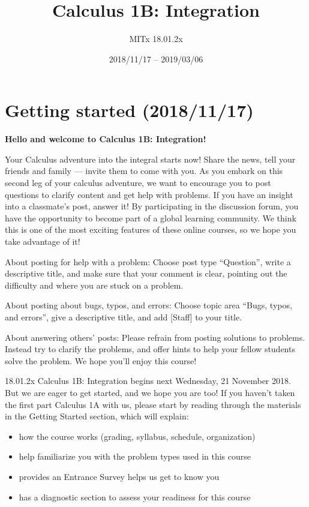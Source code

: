 \documentclass[pdftex, brazil, 12pt, twoside]{article}
\begin{document}
\title{Calculus 1B: Integration}
\author{MITx 18.01.2x}
\date{2018/11/17 -- 2019/03/06}
\maketitle
\tableofcontents




\newpage
\section{Getting started (2018/11/17)}
\label{gs}

\textbf{Hello and welcome to Calculus 1B: Integration!}

Your Calculus adventure into the integral starts now! Share the news, tell your
friends and family --- invite them to come with you. As you embark on this second
leg of your calculus adventure, we want to encourage you to post questions to
clarify content and get help with problems. If you have an insight into a classmate's
post, answer it! By participating in the discussion forum, you have the opportunity
to become part of a global learning community. We think this is one of the most
exciting features of these online courses, so we hope you take advantage of it!

About posting for help with a problem: Choose post type ``Question'', write a
descriptive title, and make sure that your comment is clear, pointing out the
difficulty and where you are stuck on a problem.

About posting about bugs, typos, and errors: Choose topic area ``Bugs, typos, and
errors'', give a descriptive title, and add [Staff] to your title.

About answering others' posts: Please refrain from posting solutions to problems.
Instead try to clarify the problems, and offer hints to help your fellow students
solve the problem. We hope you'll enjoy this course!

18.01.2x Calculus 1B: Integration begins next Wednesday, 21 November 2018.
But we are eager to get started, and we hope you are too!
If you haven't taken the first part Calculus 1A with us, please start by reading
through the materials in the Getting Started section, which will explain:

\begin{itemize}
\item how the course works (grading, syllabus, schedule, organization)
\item help familiarize you with the problem types used in this course
\item provides an Entrance Survey helps us get to know you
\item has a diagnostic section to assess your readiness for this course
\end{itemize}
\end{document}

